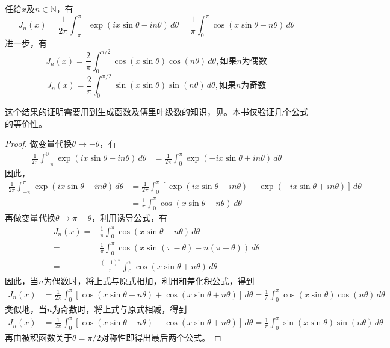 \documentclass{ctexbook}
\begin{document}
\begin{proposition}[贝塞尔积分公式]
    任给$x$及$n\in\mathbb{N}$，有
    \[J_n(x)=\frac{1}{2\pi}\int_{-\pi}^{\pi}\exp(ix\sin\theta - in\theta)\,d\theta=\frac{1}{\pi}\int_{0}^{\pi}\cos(x\sin\theta - n\theta)\,d\theta\]
    进一步，有
    \[J_n(x)=\frac{2}{\pi}\int_{0}^{\pi/2}\cos(x\sin\theta)\cos(n\theta)\,d\theta,\text{如果}n\text{为偶数}\]
    \[J_n(x)=\frac{2}{\pi}\int_{0}^{\pi/2}\sin(x\sin\theta)\sin(n\theta)\,d\theta,\text{如果}n\text{为奇数}\]
\end{proposition}
这个结果的证明需要用到生成函数及傅里叶级数的知识，见\cite{folland}。本书仅验证几个公式的等价性。
\begin{proof}
    做变量代换$\theta\to -\theta$，有
    \begin{align*}
        \frac{1}{2\pi}\int_{-\pi}^{0}\exp(ix\sin\theta - in\theta)\,d\theta&=\frac{1}{2\pi}\int_{0}^{\pi}\exp(-ix\sin\theta + in\theta)\,d\theta
    \end{align*}
    因此，
    \begin{align*}
        \frac{1}{2\pi}\int_{-\pi}^{\pi}\exp(ix\sin\theta - in\theta)\,d\theta&=\frac{1}{2\pi}\int_{0}^{\pi}[\exp(ix\sin\theta - in\theta)+\exp(-ix\sin\theta + in\theta)]\,d\theta\\
                                                                                     &=\frac{1}{\pi}\int_{0}^{\pi}\cos(x\sin\theta - n\theta)\,d\theta
    \end{align*}
    再做变量代换$\theta\to \pi-\theta$，利用诱导公式，有
    \begin{align*}
        J_n(x)=&\frac{1}{\pi}\int_{0}^{\pi}\cos(x\sin\theta - n\theta)\,d\theta\\
        =&\frac{1}{\pi}\int_{0}^{\pi}\cos(x\sin(\pi-\theta) - n(\pi-\theta))\,d\theta\\
        =&\frac{(-1)^n}{\pi}\int_{0}^{\pi}\cos(x\sin\theta + n\theta)\,d\theta
    \end{align*}
    因此，当$n$为偶数时，将上式与原式相加，利用和差化积公式，得到
    \begin{align*}
        J_n(x)&=\frac{1}{2\pi}\int_{0}^{\pi}[\cos(x\sin\theta - n\theta)+\cos(x\sin\theta + n\theta)]\,d\theta=\frac{1}{\pi}\int_{0}^{\pi}\cos(x\sin\theta)\cos(n\theta)\,d\theta
    \end{align*}
    类似地，当$n$为奇数时，将上式与原式相减，得到
    \begin{align*}
        J_n(x)&=\frac{1}{2\pi}\int_{0}^{\pi}[\cos(x\sin\theta - n\theta)-\cos(x\sin\theta + n\theta)]\,d\theta=\frac{1}{\pi}\int_{0}^{\pi}\sin(x\sin\theta)\sin(n\theta)\,d\theta
    \end{align*}
    再由被积函数关于$\theta=\pi/2$对称性即得出最后两个公式。
\end{proof}
\end{document}
